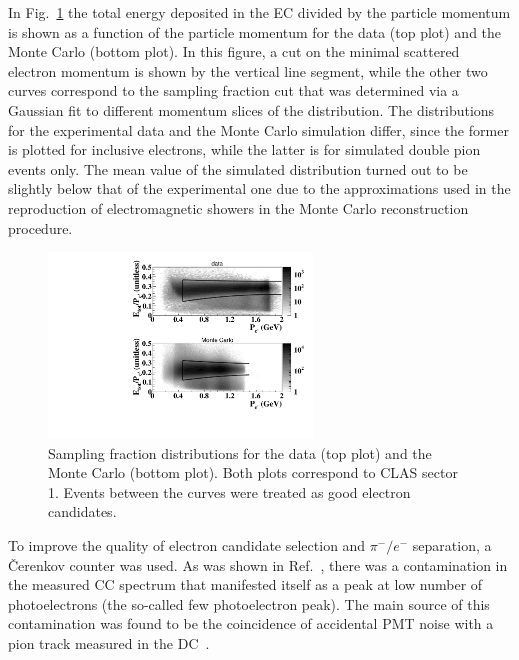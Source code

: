 \documentclass[prc,twocolumn,superscriptaddress,showpacs,amssymb,amsmath,amsfonts,aps,nofootinbib]{revtex4-1}
\begin{document}
In Fig.~\ref{fig:ec_cut} the total energy deposited in the EC divided by the particle momentum is shown as a function of the particle momentum for the data (top plot) and the Monte Carlo (bottom plot). In this figure, a cut on the minimal scattered electron momentum is shown by the vertical line segment, while the other two curves correspond to the sampling fraction cut that was determined via a Gaussian fit to different momentum slices of the distribution. The distributions for the experimental data and the Monte Carlo simulation differ, since the former is plotted for inclusive electrons, while the latter is for simulated double pion events only.
The mean value of the simulated distribution turned out to be slightly below that of the experimental one 
due to the approximations used in the reproduction of electromagnetic showers in the Monte Carlo reconstruction procedure.


\begin{figure}[htp]
\begin{center}
 \includegraphics[width=7cm,keepaspectratio]{pictures/electron_id/ec_cut.pdf}
\vspace{-0.1cm}
\caption{Sampling fraction distributions for the data (top plot) and the Monte Carlo (bottom plot). Both plots correspond to CLAS sector 1. Events between the curves were treated as good electron candidates.}
\label{fig:ec_cut}
\end{center}
\end{figure} 


To improve the quality of electron candidate selection and $\pi^{-}/e^{-}$ separation, a \v Cerenkov counter was used.
As was shown in Ref.~\cite{Osipenko:2004}, there was a contamination in the measured CC spectrum that manifested itself as a peak at low number of photoelectrons (the so-called few photoelectron peak). The main source of this contamination was found to be the coincidence of accidental PMT noise with a  pion track measured in the DC~\cite{Osipenko:2004}. 
\end{document}
